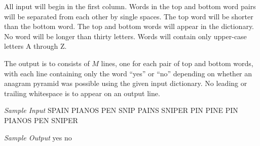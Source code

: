 \normalfont\documentclass[letterpaper,11pt]{article}
\begin{document}
All input will begin in the first column. Words in the top and bottom word pairs will be separated from each other by single spaces. The top word will be shorter than the bottom word. The top and bottom words will appear in the dictionary. No word will be longer than thirty letters. Words will contain only upper-case letters A through Z.

The output is to consists of $M$ lines, one for each pair of top and bottom words, with each line containing only the word ``yes'' or ``no'' depending on whether an anagram pyramid was possible using the given input dictionary. No leading or trailing whitespace is to appear on an output line.
\newpage

\textit{Sample Input}  \newline
SPAIN \newline
PIANOS \newline
PEN \newline
SNIP \newline
PAINS \newline
SNIPER \newline
PIN \newline
PINE  \newline
PIN PIANOS \newline
PEN SNIPER \newline

\textit{Sample Output} \newline
yes \newline
no
\end{document}
